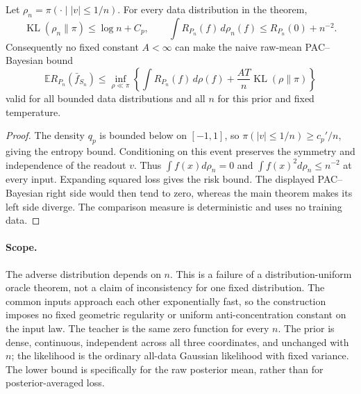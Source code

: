 \begin{corollary}
Let $\rho_n=\pi(\cdot\mid |v|\le1/n)$. For every data distribution
in the theorem,
\[
 \operatorname{KL}(\rho_n\|\pi)\le\log n+C_p,
 \qquad
 \int R_{P_n}(f)\,d\rho_n(f)
       \le R_{P_n}(0)+n^{-2}.
\]
Consequently no fixed constant $A<\infty$ can make the naive raw-mean
PAC--Bayesian bound
\[
 \mathbb E R_{P_n}(\bar f_{S_n})
 \le\inf_{\rho\ll\pi}
 \left\{\int R_{P_n}(f)\,d\rho(f)
                 +\frac{AT}{n}\operatorname{KL}(\rho\|\pi)\right\}
\]
valid for all bounded data distributions and all $n$ for this prior
and fixed temperature.
\end{corollary}
\begin{proof}
The density $q_p$ is bounded below on $[-1,1]$, so
$\pi(|v|\le1/n)\ge c_p'/n$, giving the entropy bound.
Conditioning on this event preserves the symmetry and independence
of the readout $v$. Thus $\int f(x)d\rho_n=0$ and
$\int f(x)^2d\rho_n\le n^{-2}$ at every input.
Expanding squared loss gives the risk bound. The displayed
PAC--Bayesian right side would then tend to zero, whereas the main
theorem makes its left side diverge. The comparison measure is
deterministic and uses no training data.
\end{proof}

\paragraph{Scope.}
The adverse distribution depends on $n$. This is a failure of a
distribution-uniform oracle theorem, not a claim of inconsistency for
one fixed distribution. The common inputs approach each other
exponentially fast, so the construction imposes no fixed geometric
regularity or uniform anti-concentration constant on the input law.
The teacher is the same zero function for every $n$. The prior is
dense, continuous, independent across all three coordinates, and
unchanged with $n$; the likelihood is the ordinary all-data Gaussian
likelihood with fixed variance. The lower bound is specifically for
the raw posterior mean, rather than for posterior-averaged loss.
